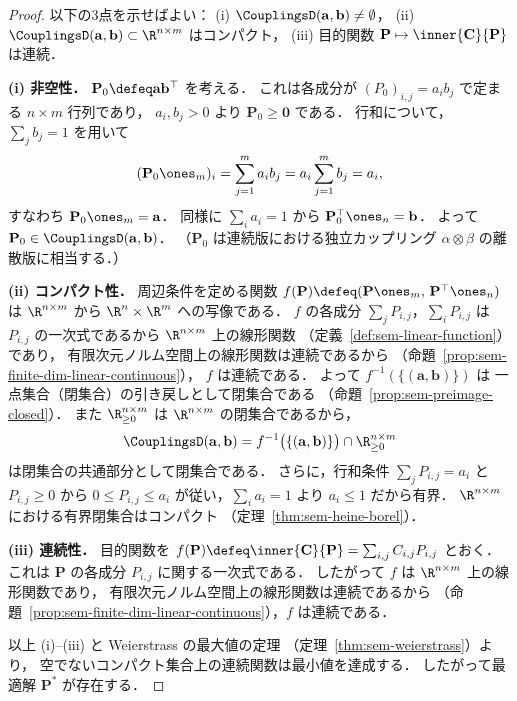 \begin{proof}
  以下の3点を示せばよい：
  (i) $\CouplingsD(\mathbf{a}, \mathbf{b}) \neq \emptyset$，
  (ii) $\CouplingsD(\mathbf{a}, \mathbf{b}) \subset \R^{n \times m}$ はコンパクト，
  (iii) 目的関数 $\mathbf{P} \mapsto \inner{\mathbf{C}}{\mathbf{P}}$ は連続．

  \textbf{(i) 非空性．}
  $\mathbf{P}_0 \defeq \mathbf{a}\mathbf{b}^\top$ を考える．
  これは各成分が $(P_0)_{i,j} = a_i b_j$ で定まる $n \times m$ 行列であり，
  $a_i, b_j > 0$ より $\mathbf{P}_0 \geq \mathbf{0}$ である．
  行和について，$\sum_j b_j = 1$ を用いて
  \[
    (\mathbf{P}_0 \ones_m)_i
    = \sum_{j=1}^m a_i b_j
    = a_i \sum_{j=1}^m b_j
    = a_i,
  \]
  すなわち $\mathbf{P}_0 \ones_m = \mathbf{a}$．
  同様に $\sum_i a_i = 1$ から $\mathbf{P}_0^\top \ones_n = \mathbf{b}$．
  よって $\mathbf{P}_0 \in \CouplingsD(\mathbf{a}, \mathbf{b})$．
  （$\mathbf{P}_0$ は連続版における独立カップリング $\alpha \otimes \beta$
  の離散版に相当する．）

  \textbf{(ii) コンパクト性．}
  周辺条件を定める関数
  $f(\mathbf{P}) \defeq (\mathbf{P}\ones_m,\, \mathbf{P}^\top \ones_n)$
  は $\R^{n \times m}$ から $\R^n \times \R^m$ への写像である．
  $f$ の各成分 $\sum_j P_{i,j}$，$\sum_i P_{i,j}$ は
  $P_{i,j}$ の一次式であるから $\R^{n \times m}$ 上の線形関数
  （定義~\ref{def:sem-linear-function}）であり，
  有限次元ノルム空間上の線形関数は連続であるから
  （命題~\ref{prop:sem-finite-dim-linear-continuous}），
  $f$ は連続である．
  よって $f^{-1}(\{(\mathbf{a}, \mathbf{b})\})$ は
  一点集合（閉集合）の引き戻しとして閉集合である
  （命題~\ref{prop:sem-preimage-closed}）．
  また $\R_{\geq 0}^{n \times m}$ は $\R^{n \times m}$ の閉集合であるから，
  \[
    \CouplingsD(\mathbf{a}, \mathbf{b})
    = f^{-1}\bigl(\{(\mathbf{a}, \mathbf{b})\}\bigr)
      \cap \R_{\geq 0}^{n \times m}
  \]
  は閉集合の共通部分として閉集合である．
  さらに，行和条件 $\sum_j P_{i,j} = a_i$ と $P_{i,j} \geq 0$ から
  $0 \leq P_{i,j} \leq a_i$ が従い，$\sum_i a_i = 1$ より $a_i \leq 1$ だから有界．
  $\R^{n \times m}$ における有界閉集合はコンパクト
  （定理~\ref{thm:sem-heine-borel}）．

  \textbf{(iii) 連続性．}
  目的関数を $f(\mathbf{P}) \defeq \inner{\mathbf{C}}{\mathbf{P}} = \sum_{i,j} C_{i,j} P_{i,j}$ とおく．
  これは $\mathbf{P}$ の各成分 $P_{i,j}$ に関する一次式である．
  したがって $f$ は $\R^{n \times m}$ 上の線形関数であり，
  有限次元ノルム空間上の線形関数は連続であるから
  （命題~\ref{prop:sem-finite-dim-linear-continuous}），$f$ は連続である．

  以上 (i)--(iii) と Weierstrass の最大値の定理
  （定理~\ref{thm:sem-weierstrass}）より，
  空でないコンパクト集合上の連続関数は最小値を達成する．
  したがって最適解 $\mathbf{P}^*$ が存在する．
\end{proof}


